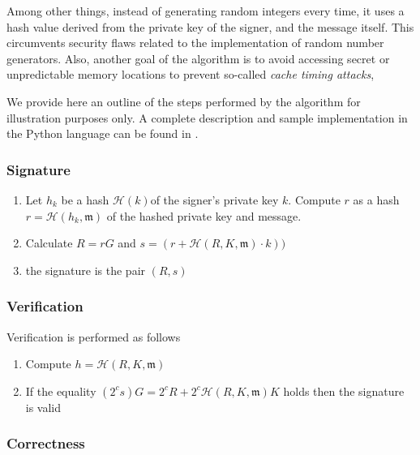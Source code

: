 Among other things, instead of generating random integers every time, it uses a hash value derived from the private key of the signer, 
and the message itself. This circumvents security flaws related to the implementation of random number generators.
Also, another goal of the algorithm is to avoid accessing secret or unpredictable memory locations to prevent so-called {\em cache timing attacks},

We provide here an outline of the steps performed by the algorithm for illustration purposes only.
A complete description and sample implementation in the Python language can be found in \cite{rfc8032}. 

\subsubsection{Signature}

\begin{enumerate}
	
	\item Let \(h_k\) be a hash \(\mathcal{H}(k)\)of the signer's private key \(k\). 
	Compute \(r\) as a hash \(r = \mathcal{H}(h_k,  \mathfrak{m})\)  of the hashed private key and message.
	
	\item Calculate \(R = r G\) and \(s = (r + \mathcal{H}(R, K,  \mathfrak{m}) \cdot k)) \)
	
	\item the signature is the pair \((R, s)\)
	
	
\end{enumerate}



\subsubsection{Verification}
Verification is performed as follows

\begin{enumerate}
	
	\item Compute \(h = \mathcal{H}(R,  K,  \mathfrak{m}) \)
	
	\item If the equality \((2^c s) G = 2^c R + 2^c \mathcal{H}(R, K,  \mathfrak{m}) K \) holds then the signature is valid
	
\end{enumerate}



\subsubsection{Correctness}

